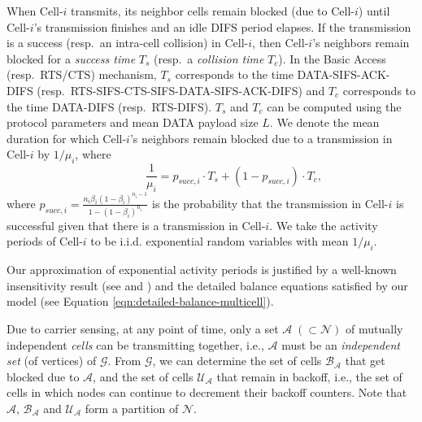 \documentclass[10pt,a4paper,journal]{IEEEtran}
\theoremstyle{definition}
\theoremstyle{remark}
\theoremstyle{plain}
\begin{document}
When Cell-$i$ transmits, its neighbor cells remain blocked (due to Cell-$i$) until Cell-$i$'s transmission finishes and an idle DIFS period elapses. If the transmission is a success (resp.~an intra-cell collision) in Cell-$i$, then Cell-$i$'s neighbors remain blocked for a \textit{success time} $T_s$ (resp.~a \textit{collision time} $T_c$). In the Basic Access (resp.~RTS/CTS) mechanism, $T_s$ corresponds to the time DATA-SIFS-ACK-DIFS (resp.~RTS-SIFS-CTS-SIFS-DATA-SIFS-ACK-DIFS) and $T_c$ corresponds to the time DATA-DIFS (resp.~RTS-DIFS). $T_s$ and $T_c$ can be computed using the protocol parameters and mean DATA payload size $L$. We denote the mean duration for which Cell-$i$'s neighbors remain blocked due to a transmission in Cell-$i$ by $1/\mu_i$, where \begin{equation}
\label{eqn:mu_i-multicell-CTMC}
\quad \quad \quad \quad \frac{1}{\mu_i} = p_{succ,i} \cdot T_s + (1-p_{succ,i}) \cdot T_c,
\end{equation} 
where $p_{succ,i} = \frac{n_i \beta_i (1 -\beta_i)^{n_i - 1}}{1 - (1 - \beta_i)^{n_i}}$ is the probability that the transmission in Cell-$i$ is successful given that there is a transmission in Cell-$i$. We take the activity periods of Cell-$i$ to be i.i.d. exponential random variables with mean $1/\mu_i$. 

Our approximation of exponential activity periods is justified by a well-known insensitivity result (see \cite[Theorem 1]{queueing.whittle85partial-balance-insensitivity} and \cite{wanet.boorstyn87multihop}) and the detailed balance equations satisfied by our model (see Equation \eqref{eqn:detailed-balance-multicell}). 

Due to carrier sensing, at any point of time, only a set ${\mathcal{A} \; (\subset \mathcal{N})}$ of mutually independent \textit{cells} can be transmitting together, i.e., $\mathcal{A}$ must be an \textit{independent set} (of vertices) of $\mathcal{G}$. From $\mathcal{G}$, we can determine the set of cells $\mathcal{B}_{\mathcal{A}}$ that get blocked due to $\mathcal{A}$, and the set of cells $\mathcal{U}_{\mathcal{A}}$ that remain in backoff, i.e., the set of cells in which nodes can continue to decrement their backoff counters. Note that $\mathcal{A}$, $\mathcal{B}_{\mathcal{A}}$ and $\mathcal{U}_{\mathcal{A}}$ form a partition of $\mathcal{N}$. 
\end{document}
